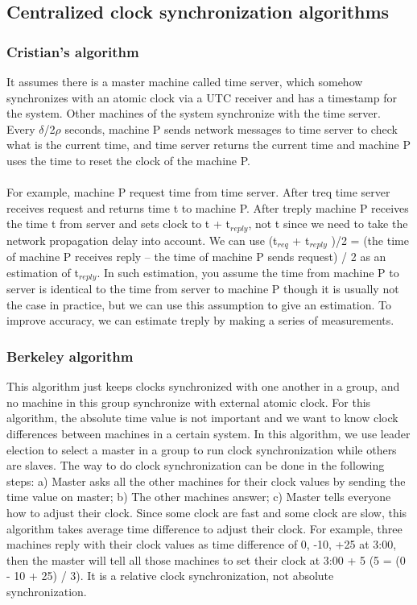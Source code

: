 \documentclass[twoside]{article}
\begin{document}
\subsection{Centralized clock synchronization algorithms}
\subsubsection{Cristian’s algorithm}
It assumes there is a master machine called time server, which somehow synchronizes with an atomic clock via a UTC receiver and has a timestamp for the system. Other machines of the system synchronize with the time server. Every $\delta$/2$\rho$ seconds, machine P sends network messages to time server to check what is the current time, and time server returns the current time and machine P uses the time to reset the clock of the machine P. \\\\
For example, machine P request time from time server. After treq time server receives request and returns time t to machine P. After treply machine P receives the time t from server and sets clock to t + t$_{reply}$, not t since we need to take the network propagation delay into account.  We can use (t$_{req}$ + t$_{reply}$ )/2 = (the time of machine P receives reply – the time of machine P sends request) / 2 as an estimation of t$_{reply}$. In such estimation, you assume the time from machine P to server is identical to the time from server to machine P though it is usually not the case in practice, but we can use this assumption to give an estimation. To improve accuracy, we can estimate treply by making a series of measurements.

\subsubsection{Berkeley algorithm}

This algorithm just keeps clocks synchronized with one another in a group, and no machine in this group synchronize with external atomic clock. For this algorithm, the absolute time value is not important and we want to know clock differences between machines in a certain system. In this algorithm, we use leader election to select a master in a group to run clock synchronization while others are slaves. The way to do clock synchronization can be done in the following steps: a) Master asks all the other machines for their clock values by sending the time value on master; b) The other machines answer; c) Master tells everyone how to adjust their clock. Since some clock are fast and some clock are slow, this algorithm takes average time difference to adjust their clock. For example, three machines reply with their clock values as time difference of 0, -10, +25 at 3:00, then the master will tell all those machines to set their clock at 3:00 + 5 (5 = (0 - 10 + 25) / 3). It is a relative clock synchronization, not absolute synchronization.
\end{document}
